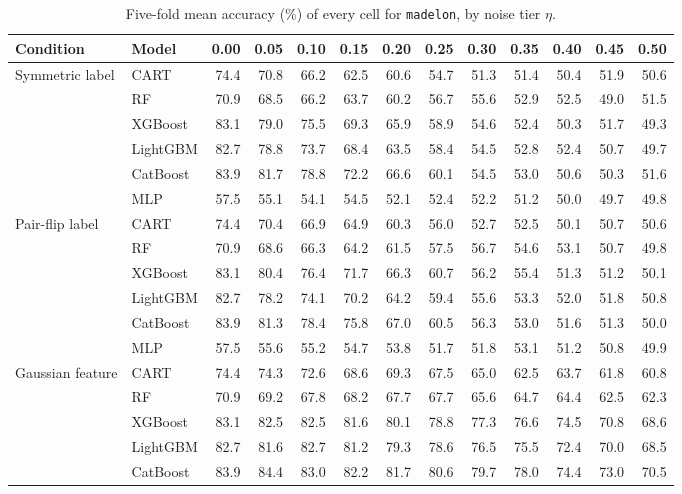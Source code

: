 \begin{table}[p]
\centering
\tiny
\setlength{\tabcolsep}{2.6pt}
\caption{Five-fold mean accuracy (\%) of every cell for \texttt{madelon}, by noise tier $\eta$.}
\label{tab:grid_madelon}
\begin{tabular}{@{}llrrrrrrrrrrr@{}}
\toprule
Condition & Model & 0.00 & 0.05 & 0.10 & 0.15 & 0.20 & 0.25 & 0.30 & 0.35 & 0.40 & 0.45 & 0.50 \\
\midrule
Symmetric label & CART & 74.4 & 70.8 & 66.2 & 62.5 & 60.6 & 54.7 & 51.3 & 51.4 & 50.4 & 51.9 & 50.6 \\
 & RF & 70.9 & 68.5 & 66.2 & 63.7 & 60.2 & 56.7 & 55.6 & 52.9 & 52.5 & 49.0 & 51.5 \\
 & XGBoost & 83.1 & 79.0 & 75.5 & 69.3 & 65.9 & 58.9 & 54.6 & 52.4 & 50.3 & 51.7 & 49.3 \\
 & LightGBM & 82.7 & 78.8 & 73.7 & 68.4 & 63.5 & 58.4 & 54.5 & 52.8 & 52.4 & 50.7 & 49.7 \\
 & CatBoost & 83.9 & 81.7 & 78.8 & 72.2 & 66.6 & 60.1 & 54.5 & 53.0 & 50.6 & 50.3 & 51.6 \\
 & MLP & 57.5 & 55.1 & 54.1 & 54.5 & 52.1 & 52.4 & 52.2 & 51.2 & 50.0 & 49.7 & 49.8 \\
\midrule
Pair-flip label & CART & 74.4 & 70.4 & 66.9 & 64.9 & 60.3 & 56.0 & 52.7 & 52.5 & 50.1 & 50.7 & 50.6 \\
 & RF & 70.9 & 68.6 & 66.3 & 64.2 & 61.5 & 57.5 & 56.7 & 54.6 & 53.1 & 50.7 & 49.8 \\
 & XGBoost & 83.1 & 80.4 & 76.4 & 71.7 & 66.3 & 60.7 & 56.2 & 55.4 & 51.3 & 51.2 & 50.1 \\
 & LightGBM & 82.7 & 78.2 & 74.1 & 70.2 & 64.2 & 59.4 & 55.6 & 53.3 & 52.0 & 51.8 & 50.8 \\
 & CatBoost & 83.9 & 81.3 & 78.4 & 75.8 & 67.0 & 60.5 & 56.3 & 53.0 & 51.6 & 51.3 & 50.0 \\
 & MLP & 57.5 & 55.6 & 55.2 & 54.7 & 53.8 & 51.7 & 51.8 & 53.1 & 51.2 & 50.8 & 49.9 \\
\midrule
Gaussian feature & CART & 74.4 & 74.3 & 72.6 & 68.6 & 69.3 & 67.5 & 65.0 & 62.5 & 63.7 & 61.8 & 60.8 \\
 & RF & 70.9 & 69.2 & 67.8 & 68.2 & 67.7 & 67.7 & 65.6 & 64.7 & 64.4 & 62.5 & 62.3 \\
 & XGBoost & 83.1 & 82.5 & 82.5 & 81.6 & 80.1 & 78.8 & 77.3 & 76.6 & 74.5 & 70.8 & 68.6 \\
 & LightGBM & 82.7 & 81.6 & 82.7 & 81.2 & 79.3 & 78.6 & 76.5 & 75.5 & 72.4 & 70.0 & 68.5 \\
 & CatBoost & 83.9 & 84.4 & 83.0 & 82.2 & 81.7 & 80.6 & 79.7 & 78.0 & 74.4 & 73.0 & 70.5 \\

\end{tabular}
\end{table}
